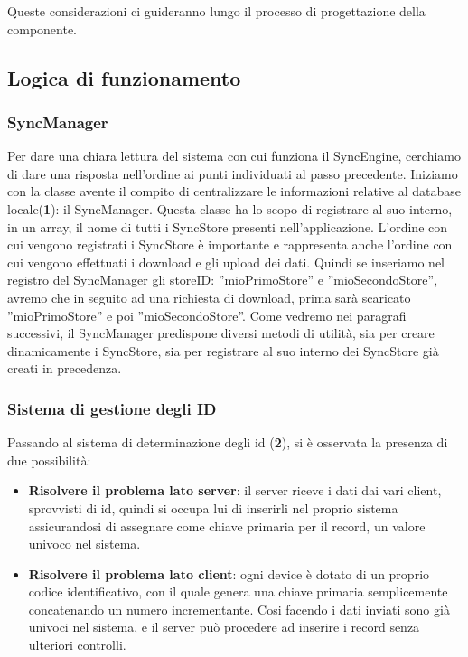 \documentclass[10pt,a4paper,onecolumn]{article}
\begin{document}
Queste considerazioni ci guideranno lungo il processo di progettazione della componente.

\subsection{Logica di funzionamento}

\subsubsection{SyncManager}
Per dare una chiara lettura del sistema con cui funziona il SyncEngine, cerchiamo di dare una risposta nell'ordine ai punti individuati al passo precedente. Iniziamo con la classe avente il compito di centralizzare le informazioni relative al database locale(\textbf{1}): il SyncManager. Questa classe ha lo scopo di registrare al suo interno, in un array, il nome di tutti i SyncStore presenti nell'applicazione. L'ordine con cui vengono registrati i SyncStore è importante e rappresenta anche l'ordine con cui vengono effettuati i download e gli upload dei dati. Quindi se inseriamo nel registro del SyncManager gli storeID: ''mioPrimoStore'' e ''mioSecondoStore'', avremo che in seguito ad una richiesta di download, prima sarà scaricato ''mioPrimoStore'' e poi ''mioSecondoStore''. Come vedremo nei paragrafi successivi, il SyncManager predispone diversi metodi di utilità, sia per creare dinamicamente i SyncStore, sia per registrare al suo interno dei SyncStore già creati in precedenza.

\subsubsection{Sistema di gestione degli ID}
Passando al sistema di determinazione degli id (\textbf{2}), si è osservata la presenza di due possibilità:
\begin{itemize}
	\item \textbf{Risolvere il problema lato server}: il server riceve i dati dai vari client, sprovvisti di id, quindi si occupa lui di inserirli nel proprio sistema assicurandosi di assegnare come chiave primaria per il record, un valore univoco nel sistema.
	\item \textbf{Risolvere il problema lato client}: ogni device è dotato di un proprio codice identificativo, con il quale genera una chiave primaria semplicemente concatenando un numero incrementante. Cosi facendo i dati inviati sono già univoci nel sistema, e il server può procedere ad inserire i record senza ulteriori controlli.
\end{itemize}
\end{document}
